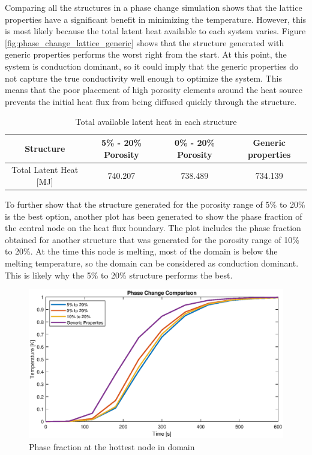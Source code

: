Comparing all the structures in a phase change simulation shows that the lattice properties have a significant benefit in minimizing the temperature. However, this is most likely because the total latent heat available to each system varies. Figure \ref{fig:phase_change_lattice_generic} shows that the structure generated with generic properties performs the worst right from the start. At this point, the system is conduction dominant, so it could imply that the generic properties do not capture the true conductivity well enough to optimize the system. This means that the poor placement of high porosity elements around the heat source prevents the initial heat flux from being diffused quickly through the structure. 

\begin{table}[ht]
  \centering
  \begin{tabular}{c | c | c | c}
    Structure & 5\% - 20\% Porosity & 0\% - 20\% Porosity & Generic properties \\ \hline
    Total Latent Heat [MJ] & 740.207 & 738.489 & 734.139 
  \end{tabular}
  \caption{Total available latent heat in each structure}
  \label{table:latent_heat_available}
\end{table}

To further show that the structure generated for the porosity range of 5\% to 20\% is the best option, another plot has been generated to show the phase fraction of the central node on the heat flux boundary. The plot includes the phase fraction obtained for another structure that was generated for the porosity range of 10\% to 20\%. At the time this node is melting, most of the domain is below the melting temperature, so the domain can be considered as conduction dominant. This is likely why the 5\% to 20\% structure performs the best.
\begin{figure}[ht]
  \centering
  \includegraphics[width=0.7\linewidth]{figures/chapter_4/PhaseFractionRate.eps}
  \caption{Phase fraction at the hottest node in domain}
  \label{fig:phase_fraction}
\end{figure}


